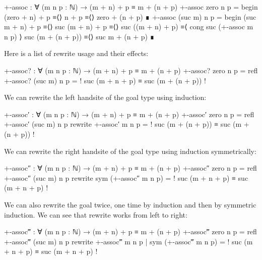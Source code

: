 \begin{code}
+-assoc : ∀ (m n p : ℕ) → (m + n) + p ≡ m + (n + p)
+-assoc zero n p =
  begin
    (zero + n) + p
  ≡⟨⟩
    n + p
  ≡⟨⟩
    zero + (n + p)
  ∎
+-assoc (suc m) n p =
  begin
    (suc m + n) + p
  ≡⟨⟩
    suc (m + n) + p
  ≡⟨⟩
    suc ((m + n) + p)
  ≡⟨ cong suc (+-assoc m n p) ⟩
    suc (m + (n + p))
  ≡⟨⟩
    suc m + (n + p)
  ∎
\end{code}

Here is a list of rewrite usage and their effects:
\begin{code}
+-assoc? : ∀ (m n p : ℕ) → (m + n) + p ≡ m + (n + p)
+-assoc? zero    n p = refl
+-assoc? (suc m) n p = {! suc (m + n + p) ≡ suc (m + (n + p)) !}
\end{code}

We can rewrite the left handsite of the goal type using induction:
\begin{code}
+-assoc′ : ∀ (m n p : ℕ) → (m + n) + p ≡ m + (n + p)
+-assoc′ zero    n p                        = refl
+-assoc′ (suc m) n p rewrite +-assoc′ m n p = {! suc (m + (n + p)) ≡ suc (m + (n + p)) !}
\end{code}

We can rewrite the right handsite of the goal type using induction symmetrically:
\begin{code}
+-assoc″ : ∀ (m n p : ℕ) → (m + n) + p ≡ m + (n + p)
+-assoc″ zero    n p                              = refl
+-assoc″ (suc m) n p rewrite sym (+-assoc″ m n p) = {! suc (m + n + p) ≡ suc (m + n + p) !}
\end{code}

We can also rewrite the goal twice, one time by induction and then by symmetric induction.
We can see that rewrite works from left to right:
\begin{code}
+-assoc‴ : ∀ (m n p : ℕ) → (m + n) + p ≡ m + (n + p)
+-assoc‴ zero    n p                                               = refl
+-assoc‴ (suc m) n p rewrite +-assoc‴ m n p | sym (+-assoc‴ m n p) = {! suc (m + n + p) ≡ suc (m + n + p) !}
\end{code}

